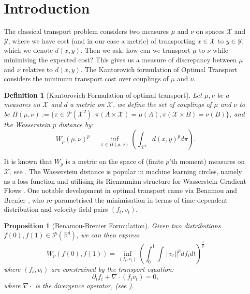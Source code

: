 \documentclass[conference]{IEEEtran}
\newcommand{\XX}{\mathcal{X}}
\newcommand{\YY}{\mathcal{Y}}
\theoremstyle{ieeestyle}
\newtheorem{prop}{Proposition}
\newtheorem{defn}{Definition}
\begin{document}
\section{Introduction}
The classical transport problem considers two measures $\mu$ and $\nu$ on spaces $\XX$ and $\YY$, where we have cost (and in our case a metric) of transporting $x \in \XX$ to $y \in \YY$, which we denote $d(x,y)$. Then we ask: how can we transport $\mu$ to $\nu$ while minimising the expected cost? This gives us a measure of discrepancy between $\mu$ and $\nu$ relative to $d(x,y)$. The Kantorovich formulation of Optimal Transport \cite{kantorovitch1958translocation} considers the minimum transport cost over couplings of $\mu$ and $\nu$.
\begin{defn}[Kantorovich Formulation of optimal transport]\label{defn: kant}
    Let $\mu,\nu$ be a measures on $\XX$ and $d$ a metric on $\XX$, we define the set of couplings of $\mu$ and $\nu$ to be $
    \Pi(\mu,\nu) := \{ \pi \in \mathcal{P}(\XX^2) : \pi(A \times \XX) = \mu(A), \pi(\XX \times B) = \nu(B) \}$, and the Wasserstein $p$ distance by:
    \begin{equation}\label{eq: kant}
        W_p(\mu,\nu)^p = \inf_{\pi \in \Pi(\mu,\nu)} \left(\int_{\XX^2} d(x,y)^p d\pi\right).
    \end{equation}
\end{defn}
It is known that $W_p$ is a metric on the space of (finite $p$'th moment) measures on $\XX$, see \cite[Definition 6.4]{villani2008optimal}. The Wasserstein distance is popular in machine learning circles, namely as a loss function \cite{arjovsky2017wasserstein,frogner2015learning,ozair2019wasserstein} and utilising its Riemannian structure for Wasserstein Gradient Flows \cite{jordan1998variational,mokrov2021large}. One notable development in optimal transport came via Benamou and Brenier \cite{benamou2000computational}, who re-parametrised the minimisation in terms of time-dependent distribution and velocity field pairs $(f_t,v_t)$.
\begin{prop}[Benamou-Brenier Formulation]\label{prop: benamou}
    Given two distributions $f(0),f(1) \in \mathcal{P}(\mathbb{R}^d)$, we can then express
    \begin{equation}\label{eq: benamou}
        W_p(f(0),f(1)) = \inf_{(f_t,v_t)} \left(\int_0^1 \int ||v_t||^p df_t dt \right)^{\frac{1}{p}}
    \end{equation}
     where $(f_t,v_t)$ are constrained by the transport equation:
    \begin{equation}\label{eq: continuity}
        \partial_t f_t + \nabla \cdot (f_t v_t) = 0,
    \end{equation}
    where $\nabla \cdot$ is the divergence operator, (see \cite{benamou2000computational}).
\end{prop}
\end{document}
